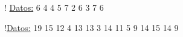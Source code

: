 \documentclass{cdplf-prueba}
\begin{document}
\begin{ejercicios}
    \task!
    \underline{Datos:} 6 {\textbullet} 4 {\textbullet} 4 {\textbullet} 5 {\textbullet} 7 {\textbullet} 2 {\textbullet} 6 {\textbullet} 3 {\textbullet} 7 {\textbullet} 6%
    \vspace{10pt}\begin{desarrollo}[height=3cm]\end{desarrollo}\vspace{10pt}
    \respuestas
  
  
    \task!\underline{Datos:} 19 {\textbullet} 15 {\textbullet} 12 {\textbullet} 4 {\textbullet} 13 {\textbullet} 13 {\textbullet} 3 {\textbullet} 14 {\textbullet} 11 {\textbullet} 5 {\textbullet} 9 {\textbullet} 14 {\textbullet} 15 {\textbullet} 14 {\textbullet} 9
    \vspace{10pt}
    \begin{desarrollo}[height=3cm]
    \end{desarrollo}
    \vspace{10pt}
    \respuestas
  

\end{ejercicios}
\end{document}
